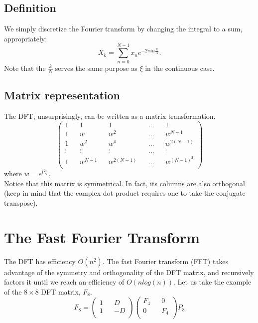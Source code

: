 \documentclass[11pt]{article}
\begin{document}
\subsection{Definition}
We simply discretize the Fourier transform by changing the integral to a sum, appropriately:
$$X_k=\sum_{n=0}^{N-1}x_n e^{-2\pi i n \frac{k}{N}}.$$
Note that the $\frac{k}{N}$ serves the same purpose as $\xi$ in the continuous case.
\subsection{Matrix representation}
The DFT, unsurprisingly, can be written as a matrix transformation.
$$
 \begin{pmatrix}
  1 && 1 && 1 && \dots && 1 \\
  1 && w && w^2 && \dots && w^{N-1}\\
  1 && w^2 && w^4 && \dots && w^{2(N-1)}\\
  \vdots && \vdots && \vdots && \dots &&\vdots \\
  1 && w^{N-1} && w^{2(N-1)} && \dots && w^{(N-1)^2} \\
 \end{pmatrix}$$
where $w=e^{i \frac{2\pi}{N}}$.\\
Notice that this matrix is symmetrical. In fact, its columns are also orthogonal (keep in mind that the complex dot product requires one to take the conjugate transpose).

\section{The Fast Fourier Transform}
The DFT has efficiency $O(n^2)$. The fast Fourier transform (FFT) takes advantage of the symmetry and orthogonality of the DFT matrix, and recursively factors it until we reach an efficiency of $O(nlog(n)).$
Let us take the example of the $8\times8$ DFT matrix, $F_8$.
$$F_8=\begin{pmatrix}
  1 && D\\
  1 && -D\\
 \end{pmatrix}
 \begin{pmatrix}
  F_4 && 0\\
  0 && F_4\\
 \end{pmatrix}
 P_8
$$
\end{document}
